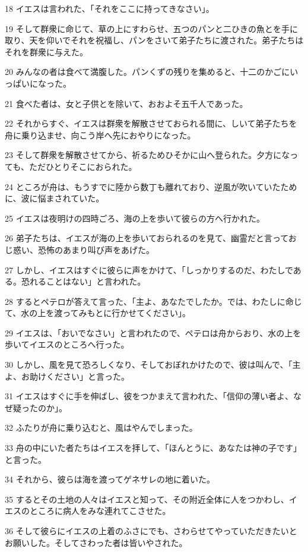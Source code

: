 \par 18 イエスは言われた、「それをここに持ってきなさい」。
\par 19 そして群衆に命じて、草の上にすわらせ、五つのパンと二ひきの魚とを手に取り、天を仰いでそれを祝福し、パンをさいて弟子たちに渡された。弟子たちはそれを群衆に与えた。
\par 20 みんなの者は食べて満腹した。パンくずの残りを集めると、十二のかごにいっぱいになった。
\par 21 食べた者は、女と子供とを除いて、おおよそ五千人であった。
\par 22 それからすぐ、イエスは群衆を解散させておられる間に、しいて弟子たちを舟に乗り込ませ、向こう岸へ先におやりになった。
\par 23 そして群衆を解散させてから、祈るためひそかに山へ登られた。夕方になっても、ただひとりそこにおられた。
\par 24 ところが舟は、もうすでに陸から数丁も離れており、逆風が吹いていたために、波に悩まされていた。
\par 25 イエスは夜明けの四時ごろ、海の上を歩いて彼らの方へ行かれた。
\par 26 弟子たちは、イエスが海の上を歩いておられるのを見て、幽霊だと言っておじ惑い、恐怖のあまり叫び声をあげた。
\par 27 しかし、イエスはすぐに彼らに声をかけて、「しっかりするのだ、わたしである。恐れることはない」と言われた。
\par 28 するとペテロが答えて言った、「主よ、あなたでしたか。では、わたしに命じて、水の上を渡ってみもとに行かせてください」。
\par 29 イエスは、「おいでなさい」と言われたので、ペテロは舟からおり、水の上を歩いてイエスのところへ行った。
\par 30 しかし、風を見て恐ろしくなり、そしておぼれかけたので、彼は叫んで、「主よ、お助けください」と言った。
\par 31 イエスはすぐに手を伸ばし、彼をつかまえて言われた、「信仰の薄い者よ、なぜ疑ったのか」。
\par 32 ふたりが舟に乗り込むと、風はやんでしまった。
\par 33 舟の中にいた者たちはイエスを拝して、「ほんとうに、あなたは神の子です」と言った。
\par 34 それから、彼らは海を渡ってゲネサレの地に着いた。
\par 35 するとその土地の人々はイエスと知って、その附近全体に人をつかわし、イエスのところに病人をみな連れてこさせた。
\par 36 そして彼らにイエスの上着のふさにでも、さわらせてやっていただきたいとお願いした。そしてさわった者は皆いやされた。

